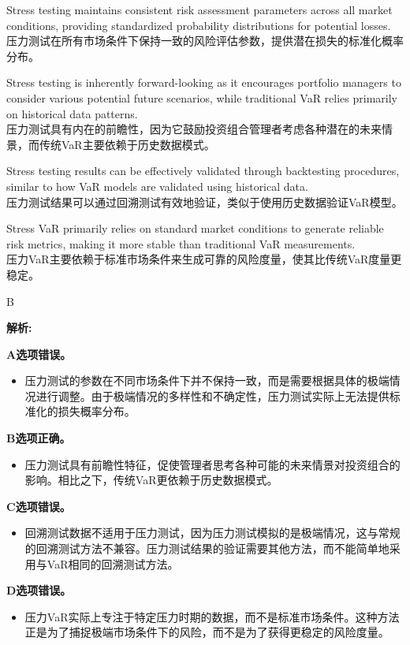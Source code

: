 \documentclass{article}
\newenvironment{explanation}
{\textbf{解析:}\par}
{\par}
\begin{document}
\begin{choices}
    \item Stress testing maintains consistent risk assessment parameters across all market conditions, providing standardized probability distributions for potential losses.\\
    压力测试在所有市场条件下保持一致的风险评估参数，提供潜在损失的标准化概率分布。
    \item Stress testing is inherently forward-looking as it encourages portfolio managers to consider various potential future scenarios, while traditional VaR relies primarily on historical data patterns.\\
    压力测试具有内在的前瞻性，因为它鼓励投资组合管理者考虑各种潜在的未来情景，而传统VaR主要依赖于历史数据模式。
    \item Stress testing results can be effectively validated through backtesting procedures, similar to how VaR models are validated using historical data.\\
    压力测试结果可以通过回溯测试有效地验证，类似于使用历史数据验证VaR模型。
    \item Stress VaR primarily relies on standard market conditions to generate reliable risk metrics, making it more stable than traditional VaR measurements.\\
    压力VaR主要依赖于标准市场条件来生成可靠的风险度量，使其比传统VaR度量更稳定。
\end{choices}

\begin{correctanswer}
    B
\end{correctanswer}

\begin{explanation}
    \textbf{A选项错误。} 
    \begin{itemize}
        \item 压力测试的参数在不同市场条件下并不保持一致，而是需要根据具体的极端情况进行调整。由于极端情况的多样性和不确定性，压力测试实际上无法提供标准化的损失概率分布。
    \end{itemize}
    
    \textbf{B选项正确。} 
    \begin{itemize}
        \item 压力测试具有前瞻性特征，促使管理者思考各种可能的未来情景对投资组合的影响。相比之下，传统VaR更依赖于历史数据模式。
    \end{itemize}
    
    \textbf{C选项错误。} 
    \begin{itemize}
        \item 回溯测试数据不适用于压力测试，因为压力测试模拟的是极端情况，这与常规的回溯测试方法不兼容。压力测试结果的验证需要其他方法，而不能简单地采用与VaR相同的回溯测试方法。
    \end{itemize}
    
    \textbf{D选项错误。} 
    \begin{itemize}
        \item 压力VaR实际上专注于特定压力时期的数据，而不是标准市场条件。这种方法正是为了捕捉极端市场条件下的风险，而不是为了获得更稳定的风险度量。
    \end{itemize}
\end{explanation}
                
\end{document}
